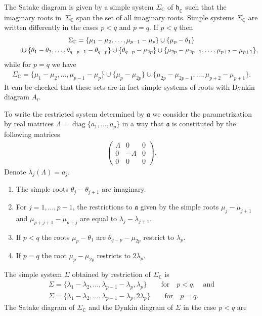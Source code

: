 \documentclass[10pt,a4paper]{amsart}
\numberwithin{equation}{section}
\begin{document}
The Satake diagram is given by a simple system $\Sigma _{\mathbb{C}}$ of $\mathfrak{h}_{\mathbb{C}}$ such that the imaginary roots in~$\Sigma _{\mathbb{C}}$ span the set of all imaginary roots. Simple systems $\Sigma _{\mathbb{C}}$ are written differently in the cases $p<q$ and $p=q$. If $p<q$ then
\begin{gather*}
\Sigma _{\mathbb{C}} = \{\mu _{1}-\mu _{2},\ldots,\mu _{p-1}-\mu _{p}\}\cup \{\mu _{p}-\theta _{1}\} \\
\hphantom{\Sigma _{\mathbb{C}} =}{} \cup \{\theta _{1}-\theta _{2},\ldots,\theta _{q-p-1}-\theta _{q-p}\}\cup \{\theta _{q-p}-\mu _{2p}\} \cup \{\mu _{2p}-\mu _{2p-1},\ldots,\mu _{p+2}-\mu _{p+1}\},
\end{gather*}
while for $p=q$ we have
\begin{gather*}
\Sigma _{\mathbb{C}}=\{\mu _{1}-\mu _{2},\ldots,\mu _{p-1}-\mu _{p}\}\cup \{\mu _{p}-\mu _{2p}\}\cup \{\mu _{2p}-\mu _{2p-1},\ldots,\mu _{p+2}-\mu_{p+1}\}.
\end{gather*}%
It can be checked that these sets are in fact simple systems of roots with Dynkin diagram $A_{l}$.

To write the restricted system determined by $\mathfrak{a}$ we consider the parametrization by real matrices $\Lambda =\operatorname{diag}\{a_{1},\ldots,a_{p}\}$ in a way that $\mathfrak{a }$ is constituted by the following
matrices
\begin{gather*}
\left(
\begin{matrix}
\Lambda & 0 & 0 \\
0 & -\Lambda & 0 \\
0 & 0 & 0%
\end{matrix}
\right).
\end{gather*}
Denote $\lambda_j(\Lambda)=a_j$.
\begin{enumerate}\itemsep=0pt
\item The simple roots $\theta _{j}-\theta _{j+1}$ are imaginary.
\item For $j=1,\ldots,p-1$, the restrictions to $\mathfrak{a}$ given by the simple roots $\mu _{j}-\mu _{j+1}$ and $\mu _{p+j+1}-\mu _{p+j}$ are equal to $\lambda _{j}-\lambda _{j+1}$.
\item If $p<q$ the roots $\mu _{p}-\theta _{1}$ are $\theta _{q-p}-\mu _{2p}$ restrict to $\lambda _{p}$.
\item If $p=q$ the root $\mu _{p}-\mu _{2p}$ restricts to $2\lambda _{p}$.
\end{enumerate}

The simple system $\Sigma $ obtained by restriction of $\Sigma _{\mathbb{C}}$ is
\begin{gather*}
\Sigma =\{\lambda _{1}-\lambda _{2},\ldots,\lambda _{p-1}-\lambda _{p},\lambda _{p}\}\qquad \text{for} \quad p<q, \quad \text{and}\\
\Sigma =\{\lambda _{1}-\lambda _{2},\ldots,\lambda _{p-1}-\lambda_{p},2\lambda _{p}\}\qquad \text{for} \quad p=q.
\end{gather*}
The Satake diagram of $\Sigma _{\mathbb{C}}$ and the Dynkin diagram of $\Sigma$ in the case $p<q$ are
\end{document}
